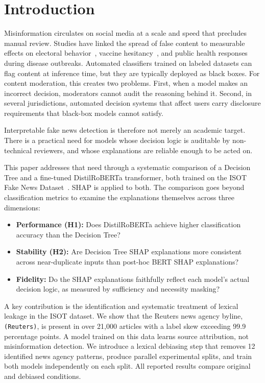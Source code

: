 \documentclass[journal,10pt,twocolumn]{IEEEtran}
\begin{document}
\section{Introduction}
\label{sec:intro}

Misinformation circulates on social media at a scale and speed that
precludes manual review.  Studies have linked the spread of false
content to measurable effects on electoral behavior~\cite{vosoughi2018spread},
vaccine hesitancy~\cite{roozenbeek2020susceptibility}, and public health
responses during disease outbreaks.  Automated classifiers trained on
labeled datasets can flag content at inference time, but they are
typically deployed as black boxes.  For content moderation, this creates
two problems.  First, when a model makes an incorrect decision,
moderators cannot audit the reasoning behind it.  Second, in several
jurisdictions, automated decision systems that affect users carry
disclosure requirements that black-box models cannot satisfy.

Interpretable fake news detection is therefore not merely an academic
target.  There is a practical need for models whose decision logic is
auditable by non-technical reviewers, and whose explanations are
reliable enough to be acted on.

This paper addresses that need through a systematic comparison of a
Decision Tree and a fine-tuned DistilRoBERTa transformer, both trained
on the ISOT Fake News Dataset~\cite{ahmed2018detecting}.  SHAP is applied
to both.  The comparison goes beyond classification metrics to examine
the explanations themselves across three dimensions:

\begin{itemize}
  \item \textbf{Performance (H1):} Does DistilRoBERTa achieve higher
        classification accuracy than the Decision Tree?
  \item \textbf{Stability (H2):} Are Decision Tree SHAP explanations
        more consistent across near-duplicate inputs than post-hoc
        BERT SHAP explanations?
  \item \textbf{Fidelity:} Do the SHAP explanations faithfully reflect
        each model's actual decision logic, as measured by sufficiency
        and necessity masking?
\end{itemize}

A key contribution is the identification and systematic treatment of
lexical leakage in the ISOT dataset.  We show that the Reuters news
agency byline, \texttt{(Reuters)}, is present in over 21{,}000 articles
with a label skew exceeding 99.9 percentage points.  A model trained on
this data learns source attribution, not misinformation detection.  We
introduce a lexical debiasing step that removes 12 identified news
agency patterns, produce parallel experimental splits, and train both
models independently on each split.  All reported results compare
original and debiased conditions.
\end{document}
